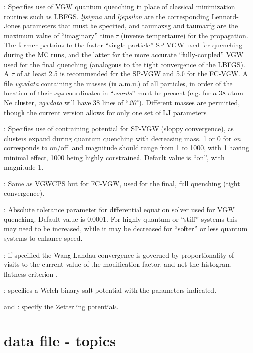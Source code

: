 {: Specifies use of VGW quantum quenching in place of
classical minimization routines such as LBFGS. {\it ljsigma} and {\it ljepsilon} are the corresponding Lennard-Jones
parameters that must be specified, and taumaxsg and taumaxfg are the maximum value of ``imaginary'' time $\tau$ (inverse tempertaure) for the propagation.
The former pertains to the faster ``single-particle'' SP-VGW used for quenching during the MC runs, and the latter for the more accurate
``fully-coupled'' VGW used for the final quenching (analogous to the tight convergence of the LBFGS). A $\tau$ of at least
2.5 is recommended for the SP-VGW and 5.0 for the FC-VGW. A file {\it vgwdata} containing the masses (in a.m.u.) of all particles, in order of the location
of their {\it xyz} coordinates in ``{\it coords}'' must be present (e.g. for a 38 atom Ne cluster, {\it vgwdata} will have 38 lines of ``{\it 20}''). Different
masses are permitted, though the current version allows for only one set of LJ parameters. 

: Specifies use of contraining potential for SP-VGW (sloppy convergence), as clusters expand during quantum quenching
with decreasing mass. 1 or 0 for {\it on} corresponds to on/off,
and magnitude should range from 1 to 1000, with 1 having minimal effect, 1000 being highly constrained. Default value is ``on'', with magnitude 1.

: Same as VGWCPS but for FC-VGW, used for the final, full quenching (tight convergence).

: Absolute tolerance parameter for differential equation solver used for VGW quenching. Default value is 0.0001.
For highly quantum or ``stiff'' systems this may need to be increased, while it may be decreased for ``softer'' or less quantum systems to enhance
speed.
 
: if specified the Wang-Landau convergence is governed by proportionality of visits to the current value of
the modification factor, and not the histogram flatness criterion \cite{ZhouB03}.

: specifies a Welch binary
salt potential with the parameters indicated.

 and {\/}: specify the Zetterling potentials.


\section{data file - topics}

}
